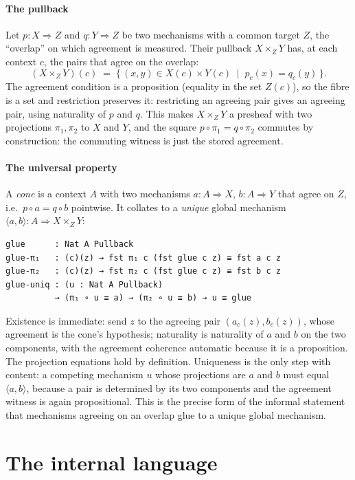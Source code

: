 \documentclass{lmcs}
\begin{document}
\paragraph{The pullback}
Let $p : X \Rightarrow Z$ and $q : Y \Rightarrow Z$ be two mechanisms with a common target $Z$, the ``overlap'' on which agreement is measured.
Their pullback $X \times_Z Y$ has, at each context $c$, the pairs that agree on the overlap:
\[ (X \times_Z Y)(c) \;=\; \{\, (x,y) \in X(c)\times Y(c) \;\mid\; p_c(x) = q_c(y) \,\}. \]
The agreement condition is a proposition (equality in the set $Z(c)$), so the fibre is a set and restriction preserves it: restricting an agreeing pair gives an agreeing pair, using naturality of $p$ and $q$.
This makes $X \times_Z Y$ a presheaf with two projections $\pi_1, \pi_2$ to $X$ and $Y$, and the square $p \circ \pi_1 = q \circ \pi_2$ commutes by construction: the commuting witness is just the stored agreement.

\paragraph{The universal property}
A \emph{cone} is a context $A$ with two mechanisms $a : A \Rightarrow X$, $b : A \Rightarrow Y$ that agree on $Z$, i.e.\ $p \circ a = q \circ b$ pointwise.
It collates to a \emph{unique} global mechanism $\langle a, b\rangle : A \Rightarrow X \times_Z Y$:
\begin{lstlisting}
glue      : Nat A Pullback
glue-π₁   : (c)(z) → fst π₁ c (fst glue c z) ≡ fst a c z
glue-π₂   : (c)(z) → fst π₂ c (fst glue c z) ≡ fst b c z
glue-uniq : (u : Nat A Pullback)
          → (π₁ ∘ u ≡ a) → (π₂ ∘ u ≡ b) → u ≡ glue
\end{lstlisting}
Existence is immediate: send $z$ to the agreeing pair $(a_c(z), b_c(z))$, whose agreement is the cone's hypothesis; naturality is naturality of $a$ and $b$ on the two components, with the agreement coherence automatic because it is a proposition.
The projection equations hold by definition.
Uniqueness is the only step with content: a competing mechanism $u$ whose projections are $a$ and $b$ must equal $\langle a,b\rangle$, because a pair is determined by its two components and the agreement witness is again propositional.
This is the precise form of the informal statement that mechanisms agreeing on an overlap glue to a unique global mechanism.

\section{The internal language}\label{sec:forcing}
\end{document}
